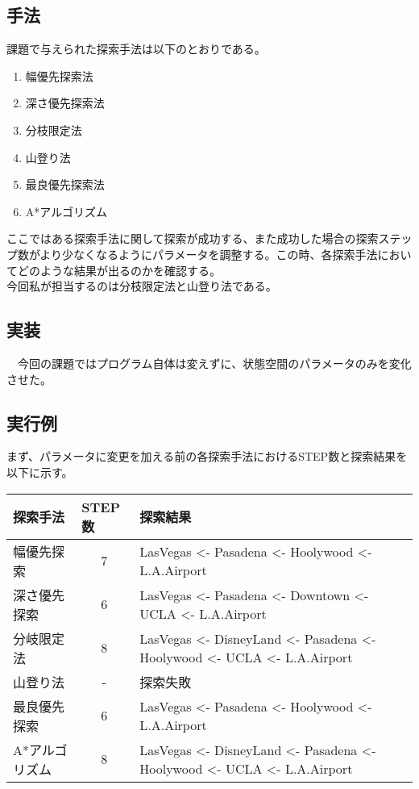 \documentclass[a4j]{jarticle}
\begin{document}
\subsection{手法}
課題で与えられた探索手法は以下のとおりである。
\begin{enumerate}
\item 幅優先探索法
\item 深さ優先探索法
\item 分枝限定法
\item 山登り法
\item 最良優先探索法
\item A*アルゴリズム
\end{enumerate}

ここではある探索手法に関して探索が成功する、また成功した場合の探索ステップ数がより少なくなるようにパラメータを調整する。この時、各探索手法においてどのような結果が出るのかを確認する。\\
今回私が担当するのは分枝限定法と山登り法である。

\subsection{実装}
　今回の課題ではプログラム自体は変えずに、状態空間のパラメータのみを変化させた。
\subsection{実行例}

まず、パラメータに変更を加える前の各探索手法におけるSTEP数と探索結果を以下に示す。
\begin{table}[h]
\begin{tabular}{|l|c|l|}
\hline
探索手法     & \multicolumn{1}{l|}{STEP数} & 探索結果                                                                                             \\ \hline
幅優先探索 & 7 & LasVegas \textless{}- Pasadena \textless{}- Hoolywood \textless{}- L.A.Airport                   \\ \hline
深さ優先探索 & 6 & LasVegas \textless{}- Pasadena \textless{}- Downtown \textless{}- UCLA \textless{}- L.A.Airport                   \\ \hline
分岐限定法 & 8 & LasVegas \textless{}- DisneyLand \textless{}- Pasadena \textless{}- Hoolywood \textless{}- UCLA \textless{}- L.A.Airport                   \\ \hline
山登り法 & - & 探索失敗 \\ \hline
最良優先探索 & 6 & LasVegas \textless{}- Pasadena \textless{}- Hoolywood \textless{}- L.A.Airport                 \\ \hline
A*アルゴリズム & 8 & LasVegas \textless{}- DisneyLand \textless{}- Pasadena \textless{}- Hoolywood \textless{}- UCLA \textless{}- L.A.Airport                 \\ \hline
\end{tabular}
\end{table}
\end{document}
